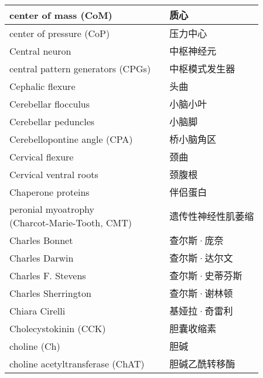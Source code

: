 \begin{longtable}{lll}
	\midrule
	center of mass (CoM)   && 质心  \\
	
	\midrule
	center of pressure (CoP)   && 压力中心  \\
	
	\midrule
	Central neuron   && 中枢神经元  \\
	
	\midrule
	central pattern generators (CPGs)   && 中枢模式发生器  \\
	
	\midrule
	Cephalic flexure   && 头曲  \\
	
	\midrule
	Cerebellar flocculus   && 小脑小叶  \\
	
	\midrule
	Cerebellar peduncles   && 小脑脚  \\
	
	\midrule
	Cerebellopontine angle (CPA)   && 桥小脑角区  \\
	
	\midrule
	Cervical flexure   && 颈曲  \\
	
	\midrule
	Cervical ventral roots   && 颈腹根  \\
	
	\midrule
	Chaperone proteins   && 伴侣蛋白  \\
	
	\midrule
	\makecell{peronial myoatrophy \\ (Charcot-Marie-Tooth, CMT)}   && 遗传性神经性肌萎缩  \\
	
	\midrule
	Charles Bonnet   && 查尔斯·庞奈  \\
	
	\midrule
	Charles Darwin   && 查尔斯·达尔文  \\
	
	\midrule
	Charles F. Stevens   && 查尔斯·史蒂芬斯  \\
	
	\midrule
	Charles Sherrington   && 查尔斯·谢林顿  \\
	
	\midrule
	Chiara Cirelli   && 基娅拉·奇雷利  \\
	
	\midrule
	Cholecystokinin (CCK)   && 胆囊收缩素  \\
	
	\midrule
	choline (Ch)   && 胆碱  \\
	
	\midrule
	choline acetyltransferase (ChAT)   && 胆碱乙酰转移酶  \\
	

\end{longtable}
